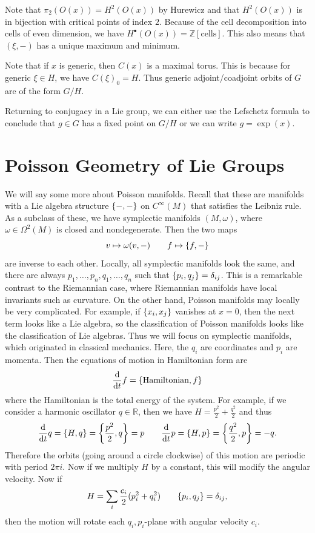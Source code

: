 \documentclass[leqno, openany]{memoir}
\theoremstyle{definition}
\theoremstyle{remark}
\theoremstyle{plain}
\theoremstyle{definition}
\theoremstyle{remark}
\newcommand{\R}{\mathbb{R}}
\newcommand{\Z}{\mathbb{Z}}
\begin{document}
Note that $\pi_2(O(x)) = H^2(O(x))$ by Hurewicz and that $H^2(O(x))$ is in bijection with critical points of index $2$. Because of the cell decomposition into cells of even dimension, we have $H^{\bullet}(O(x)) = \Z[\text{cells}]$. This also means that $(\xi, -)$ has a unique maximum and minimum.

Note that if $x$ is generic, then $C(x)$ is a maximal torus. This is because for generic $\xi \in H$, we have $C(\xi)_0 = H$. Thus generic adjoint/coadjoint orbits of $G$ are of the form $G/H$.

Returning to conjugacy in a Lie group, we can either use the Lefschetz formula to conclude that $g \in G$ has a fixed point on $G/H$ or we can write $g = \exp(x)$.

\section{Poisson Geometry of Lie Groups}%
\label{sec:geometry_of_lie_groups}

We will say some more about Poisson manifolds. Recall that these are manifolds with a Lie algebra structure $\qty{-,-}$ on $C^{\infty}(M)$ that satisfies the Leibniz rule. As a subclass of these, we have symplectic manifolds $(M, \omega)$, where $\omega \in \Omega^2 (M)$ is closed and nondegenerate. Then the two maps 
\[ v \mapsto \omega(v, -) \qquad f \mapsto \qty{f, -}\] 
are inverse to each other. Locally, all symplectic manifolds look the same, and there are always $p_1, \ldots, p_n, q_1, \ldots, q_n$ such that $\qty{p_i, q_j} = \delta_{ij}$. This is a remarkable contrast to the Riemannian case, where Riemannian manifolds have local invariants such as curvature. On the other hand, Poisson manifolds may locally be very complicated. For example, if $\qty{x_i, x_j}$ vanishes at $x = 0$, then the next term looks like a Lie algebra, so the classification of Poisson manifolds looks like the classification of Lie algebras. Thus we will focus on symplectic manifolds, which originated in classical mechanics. Here, the $q_i$ are coordinates and $p_i$ are momenta. Then the equations of motion in Hamiltonian form are
\[ \dv{t} f = \qty{\text{Hamiltonian}, f} \]
where the Hamiltonian is the total energy of the system. For example, if we consider a harmonic oscillator $q \in \R$, then we have $H = \frac{p^2}{2} + \frac{q^2}{2}$ and thus
\[ \dv{t} q = \qty{H, q} = \qty{\frac{p^2}{2}, q} = p \qquad \dv{t} p = \qty{H, p} = \qty{\frac{q^2}{2}, p} = -q. \]
Therefore the orbits (going around a circle clockwise) of this motion are periodic with period $2 \pi i$. Now if we multiply $H$ by a constant, this will modify the angular velocity. Now if
\[ H = \sum_i \frac{c_i}{2} (p_i^2 + q_i^2) \qquad \qty{p_i, q_j} = \delta_{ij}, \]
then the motion will rotate each $q_i,p_i$-plane with angular velocity $c_i$.
\end{document}
